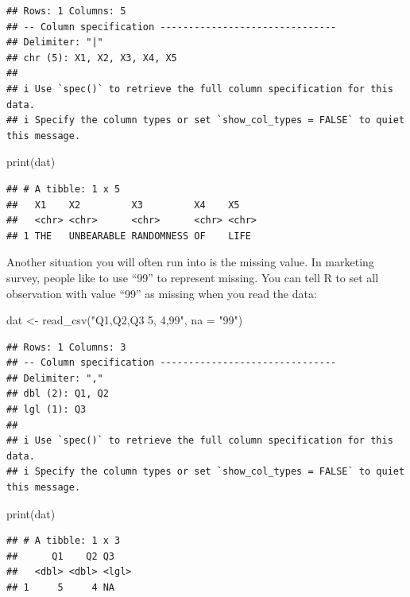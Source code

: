 \documentclass[
  12pt,
]{krantz}
\makeatletter
\newenvironment{Shaded}{\begin{snugshade}}{\end{snugshade}}
\newcommand{\AttributeTok}[1]{\textcolor[rgb]{0.61,0.61,0.61}{#1}}
\newcommand{\FunctionTok}[1]{\textcolor[rgb]{0,0,0}{#1}}
\newcommand{\NormalTok}[1]{#1}
\newcommand{\OtherTok}[1]{\textcolor[rgb]{0.37,0.37,0.37}{#1}}
\newcommand{\StringTok}[1]{\textcolor[rgb]{0.5,0.5,0.5}{#1}}
\newenvironment{kframe}{%
\medskip{}
\setlength{\fboxsep}{.8em}
 \def\at@end@of@kframe{}%
 \ifinner\ifhmode%
  \def\at@end@of@kframe{\end{minipage}}%
  \begin{minipage}{\columnwidth}%
 \fi\fi%
 \def\FrameCommand##1{\hskip\@totalleftmargin \hskip-\fboxsep
 \colorbox{shadecolor}{##1}\hskip-\fboxsep
     \hskip-\linewidth \hskip-\@totalleftmargin \hskip\columnwidth}%
 \MakeFramed {\advance\hsize-\width
   \@totalleftmargin\z@ \linewidth\hsize
   \@setminipage}}%
 {\par\unskip\endMakeFramed%
 \at@end@of@kframe}
\renewenvironment{Shaded}{\begin{kframe}}{\end{kframe}}
\makeatother
\begin{document}
\begin{verbatim}
## Rows: 1 Columns: 5
## -- Column specification -------------------------------
## Delimiter: "|"
## chr (5): X1, X2, X3, X4, X5
## 
## i Use `spec()` to retrieve the full column specification for this data.
## i Specify the column types or set `show_col_types = FALSE` to quiet this message.
\end{verbatim}

\begin{Shaded}
\begin{Highlighting}[]
\FunctionTok{print}\NormalTok{(dat)}
\end{Highlighting}
\end{Shaded}

\begin{verbatim}
## # A tibble: 1 x 5
##   X1    X2         X3         X4    X5   
##   <chr> <chr>      <chr>      <chr> <chr>
## 1 THE   UNBEARABLE RANDOMNESS OF    LIFE
\end{verbatim}

Another situation you will often run into is the missing value. In marketing survey, people like to use ``99'' to represent missing. You can tell R to set all observation with value ``99'' as missing when you read the data:

\begin{Shaded}
\begin{Highlighting}[]
\NormalTok{dat }\OtherTok{\textless{}{-}} \FunctionTok{read\_csv}\NormalTok{(}\StringTok{"Q1,Q2,Q3}
\StringTok{               5, 4,99"}\NormalTok{, }
               \AttributeTok{na =} \StringTok{"99"}\NormalTok{)}
\end{Highlighting}
\end{Shaded}

\begin{verbatim}
## Rows: 1 Columns: 3
## -- Column specification -------------------------------
## Delimiter: ","
## dbl (2): Q1, Q2
## lgl (1): Q3
## 
## i Use `spec()` to retrieve the full column specification for this data.
## i Specify the column types or set `show_col_types = FALSE` to quiet this message.
\end{verbatim}

\begin{Shaded}
\begin{Highlighting}[]
\FunctionTok{print}\NormalTok{(dat)}
\end{Highlighting}
\end{Shaded}

\begin{verbatim}
## # A tibble: 1 x 3
##      Q1    Q2 Q3   
##   <dbl> <dbl> <lgl>
## 1     5     4 NA
\end{verbatim}
\end{document}
